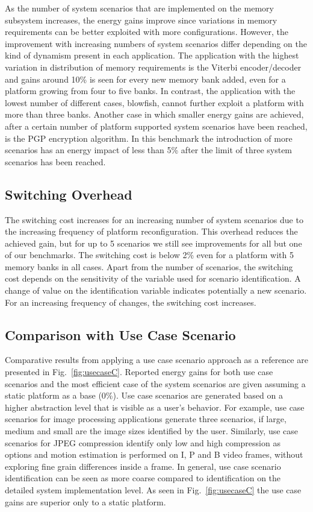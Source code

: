 As the number of system scenarios that are implemented on the memory subsystem increases, the energy gains improve since variations in memory requirements can be better exploited with more configurations. 
However, the improvement with increasing numbers of system scenarios differ depending on the kind of dynamism present in each application. 
The application with the highest variation in distribution of memory requirements is the Viterbi encoder/decoder and gains around 10\% is seen for every new memory bank added, even for a platform growing from four to five banks. 
In contrast, the application with the lowest number of different cases, blowfish, cannot further exploit a platform with more than three banks. 
Another case in which smaller energy gains are achieved, after a certain number of platform supported system scenarios have been reached, is the PGP encryption algorithm. 
In this benchmark the introduction of more scenarios has an energy impact of less than 5\% after the limit of three system scenarios has been reached. 

\subsection{Switching Overhead}

The switching cost increases for an increasing number of system scenarios due to the increasing frequency of platform reconfiguration. 
This overhead reduces the achieved gain, but for up to 5 scenarios we still see improvements for all but one of our benchmarks. 
The switching cost is below 2\% even for a platform with 5 memory banks in all cases.
Apart from the number of scenarios, the switching cost depends on the sensitivity of the variable used for scenario identification. 
A change of value on the identification variable indicates potentially a new scenario. 
For an increasing frequency of changes, the switching cost increases.

\subsection{Comparison with Use Case Scenario}

Comparative results from applying a use case scenario approach as a reference are presented in Fig.~\ref{fig:usecaseC}. 
Reported energy gains for both use case scenarios and the most efficient case of the system scenarios are given assuming a static platform as a base (0\%). 
Use case scenarios are generated based on a higher abstraction level that is visible as a user's behavior. 
For example, use case scenarios for image processing applications generate three scenarios, if large, medium and small are the image sizes identified by the user. 
Similarly, use case scenarios for JPEG compression identify only low and high compression as options and motion estimation is performed on I, P and B video frames, without exploring fine grain differences inside a frame. 
In general, use case scenario identification can be seen as more coarse compared to identification on the detailed system implementation level. 
As seen in Fig.~\ref{fig:usecaseC} the use case gains are superior only to a static platform.

